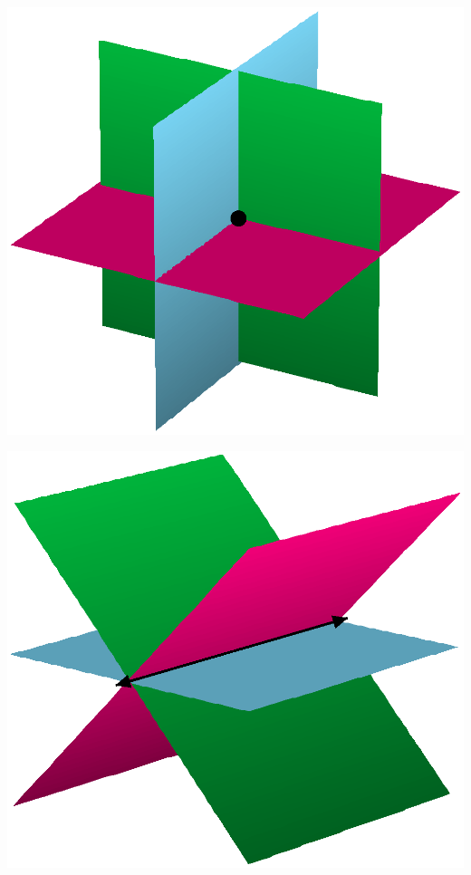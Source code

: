 \documentclass{report}
\theoremstyle{definition}
\begin{document}
\begin{minipage}{0.45\linewidth}
	\vspace{-0.25cm}
	\begin{center}
		\includegraphics[scale=0.35]{SingleSolution.eps}
	\end{center}
\end{minipage}
\hfill 
\begin{minipage}{0.45\linewidth}
	\vspace{-0.25cm}
	\begin{center}
		\includegraphics[scale=0.35]{InfiniteSolution.eps}
	\end{center}
\end{minipage}
\end{document}
